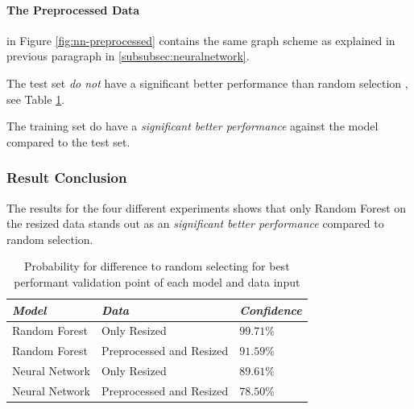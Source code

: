 \paragraph{The Preprocessed Data}
in Figure \ref{fig:nn-preprocessed} contains the same graph scheme as explained in previous paragraph in \ref{subsubsec:neuralnetwork}. 

The test set \emph{do not} have a significant better performance than random selection
, see Table \ref{tab:result-conclusion}.

The training set do have a \emph{significant better performance} against the model compared to the test set.

\subsubsection{Result Conclusion}
The results for the four different experiments shows that only Random Forest on the resized data stands out as an \emph{significant better performance} compared to random selection.

\begin{table}
  \caption{Probability for difference to random selecting for best performant validation point of each model and data input}
  \label{tab:result-conclusion}
  \begin{tabularx}{0.9\linewidth}{|X|X|l|} \hline
    \emph{Model}   & \emph{Data}               & \emph{Confidence} \\ \hline
    Random Forest  & Only Resized              & \(99.71 \%\)      \\ \hline
    Random Forest  & Preprocessed and Resized  & \(91.59 \%\)      \\ \hline
    Neural Network & Only Resized              & \(89.61 \%\)      \\ \hline
    Neural Network & Preprocessed and  Resized & \(78.50 \%\)      \\ \hline
  \end{tabularx}
\end{table}

\label{subsec:evaluation}
